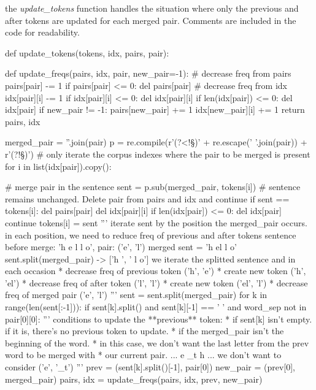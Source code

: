 the \emph{update\_tokens} function handles the situation where only the previous and after tokens are updated for each merged pair. Comments are included in the code for readability.

\begin{python}
def update_tokens(tokens, idx, pairs, pair):

  def update_freqs(pairs, idx, pair, new_pair=-1):
    # decrease freq from pairs
    pairs[pair] -= 1
    if pairs[pair] <= 0: del pairs[pair]
    # decrease freq from idx
    idx[pair][i] -= 1
    if idx[pair][i] <= 0: del idx[pair][i]
    if len(idx[pair]) <= 0: del idx[pair]
    if new_pair != -1:
      pairs[new_pair] += 1
      idx[new_pair][i] += 1
    return pairs, idx

  merged_pair = ''.join(pair)
  p = re.compile(r'(?<!\S)' + re.escape(' '.join(pair)) + r'(?!\S)')
  # only iterate the corpus indexes where the pair to be merged is present
  for i in list(idx[pair]).copy():

    # merge pair in the sentence
    sent = p.sub(merged_pair, tokens[i])
    # sentence remains unchanged. Delete pair from pairs and idx and continue
    if sent == tokens[i]:
      del pairs[pair]
      del idx[pair][i]
      if len(idx[pair]) <= 0:
        del idx[pair]
      continue
    tokens[i] = sent
    '''
    iterate sent by the position the merged_pair occurs. 
    in each position, we need to reduce freq of previous and after tokens
    sentence before merge: 'h e l l o', pair: ('e', 'l')
    merged sent = 'h el l o'
    sent.split(merged_pair) -> ['h ', ' l o']
    we iterate the splitted sentence and in each occasion
    * decrease freq of previous token ('h', 'e')
        * create new token ('h', 'el')
    * decrease freq of after token ('l', 'l')
        * create new token ('el', 'l')
    * decrease freq of merged pair ('e', 'l')
    '''
    sent = sent.split(merged_pair)
    for k in range(len(sent[:-1])):
      if sent[k].split() and sent[k][-1] == ' ' and word_sep not in pair[0][0]:
        '''
        conditions to update the **previous** token:
        * if sent[k] isn't empty. if it is, there's no previous token to update.
        * if the merged_pair isn't the beginning of the word.
          * in this case, we don't want the last letter from the prev word to be merged with
          * our current pair. ... e _t h ... we don't want to consider ('e', '_t')
        '''
        prev = (sent[k].split()[-1], pair[0])
        new_pair = (prev[0], merged_pair)
        pairs, idx = update_freqs(pairs, idx, prev, new_pair)


\end{python}

